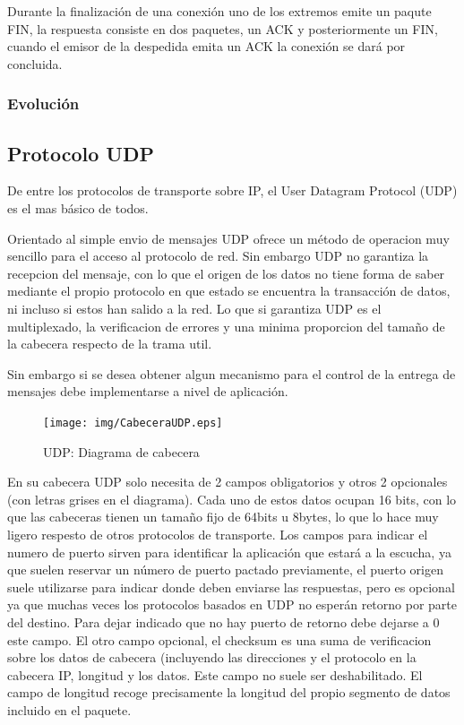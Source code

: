 \documentclass[a4paper,spanish,12pt]{book}
\begin{document}
Durante la finalización de una conexión uno de los extremos emite un paqute FIN, la respuesta consiste en dos paquetes, un ACK y posteriormente un FIN, cuando el emisor de la despedida emita un ACK la conexión se dará por concluida.

\subsubsection{Evolución}

\subsection{Protocolo UDP}

De entre los protocolos de transporte sobre IP, el User Datagram Protocol (UDP) es el mas básico de todos.

Orientado al simple envio de mensajes UDP ofrece un m\'etodo de operacion muy sencillo para el acceso al protocolo de red. Sin embargo UDP no garantiza la recepcion del mensaje, con lo que el origen de los datos no tiene forma de saber mediante el propio protocolo en que estado se encuentra la transacción de datos, ni incluso si estos han salido a la red. Lo que si garantiza UDP es el multiplexado, la verificacion de errores y una minima proporcion del tamaño de la cabecera respecto de la trama util. 

Sin embargo si se desea obtener algun mecanismo para el control de la entrega de mensajes debe implementarse a nivel de aplicación.
\begin{figure}[h]
	\begin{center}
	\texttt{[image: img/CabeceraUDP.eps]}	
\end{center}
\caption{UDP: Diagrama de cabecera}
  \label{fig:CabeceraUDP}
\end{figure}

En su cabecera UDP solo necesita de 2 campos obligatorios y otros 2 opcionales (con letras grises en el diagrama). Cada uno de estos datos ocupan 16 bits, con lo que las cabeceras tienen un tamaño fijo de 64bits u 8bytes, lo que lo hace muy ligero respesto de otros protocolos de transporte. Los campos para indicar el numero de puerto sirven para identificar la aplicación que estará a la escucha, ya que suelen reservar un número de puerto pactado previamente, el puerto origen suele utilizarse para indicar donde deben enviarse las respuestas, pero es opcional ya que muchas veces los protocolos basados en UDP no esperán retorno por parte del destino. Para dejar indicado que no hay puerto de retorno debe dejarse a 0 este campo. El otro campo opcional, el checksum es una suma de verificacion sobre los datos de cabecera (incluyendo las direcciones y el protocolo en la cabecera IP, longitud y los datos. Este campo no suele ser deshabilitado. El campo de longitud recoge precisamente la longitud del propio segmento de datos incluido en el paquete.
\end{document}

